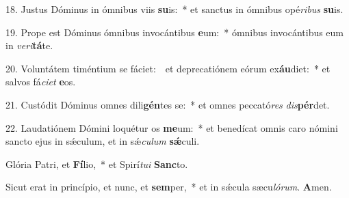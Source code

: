 \begin{latinenglishsection}
{	18. Justus Dóminus in ómnibus viis \textbf{su}is:~*
		et sanctus in ómnibus opé\textit{ri}\textit{bus} \textbf{su}is.
	
	19. Prope est Dóminus ómnibus invocántibus \textbf{e}um:~*
		ómnibus invocántibus eum in \textit{ve}\textit{ri}\textbf{tá}te.
	
	20. Voluntátem timéntium se fáciet:~\GreDagger\
		et deprecatiónem eórum ex\textbf{áu}diet:~*
		et salvos fá\textit{ci}\textit{et} \textbf{e}os.
	
	21. Custódit Dóminus omnes dili\textbf{gén}tes se:~*
		et omnes peccató\textit{res} \textit{dis}\textbf{pér}det.
	
	22. Laudatiónem Dómini loquétur os \textbf{me}um:~*
		et benedícat omnis caro nómini sancto ejus in s\'{\ae}culum, et in s\'{\ae}\textit{cu}\textit{lum} \textbf{s\'{\ae}}culi.
	
	Glória Patri, et \textbf{Fí}lio,~*
		et Spirí\textit{tu}\textit{i} \textbf{Sanc}to.
	
	Sicut erat in princípio, et nunc, et \textbf{sem}per,~*
		et in s\'{\ae}cula sæcu\textit{ló}\textit{rum}. \textbf{A}men.

}{
	
}

\end{latinenglishsection}
